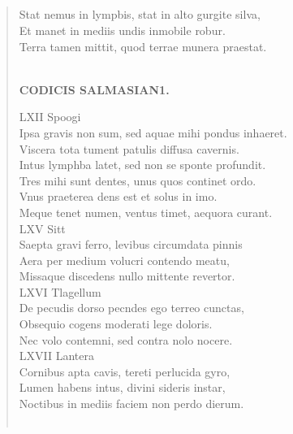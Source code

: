 \documentclass[11pt, a4paper]{report}
\begin{document}
            \subsection*{}
      \begin{verse}
      Stat nemus in lympbis, stat in alto gurgite silva, \\ Et manet in mediis undis inmobile robur. \\ Terra tamen mittit, quod terrae munera praestat. \\ 
        ﻿\pagebreak 
    \begin{center} \textbf{CODICIS SALMASIAN1.} \end{center} \marginpar{[237]} LXII Spoogi \\ Ipsa gravis non sum, sed aquae mihi pondus inhaeret. \\ Viscera tota tument patulis diffusa cavernis. \\ Intus lymphba latet, sed non se sponte profundit. \\ Tres mihi sunt dentes, unus quos continet ordo. \\ Vnus praeterea dens est et solus in imo. \\ Meque tenet numen, ventus timet, aequora curant. \\ LXV Sitt \\ Saepta gravi ferro, levibus circumdata pinnis \\ Aera per medium volucri contendo meatu, \\ Missaque discedens nullo mittente revertor. \\ LXVI Tlagellum \\ De pecudis dorso pecndes ego terreo cunctas, \\ Obsequio cogens moderati lege doloris. \\ Nec volo contemni, sed contra nolo nocere. \\ LXVII Lantera \\ Cornibus apta cavis, tereti perlucida gyro, \\ Lumen habens intus, divini sideris instar, \\ Noctibus in mediis faciem non perdo dierum. \\ 
        ﻿\pagebreak 

\end{verse}
\end{document}
